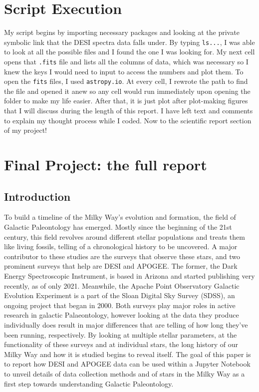 \documentclass{article}
\begin{document}
\section*{Script Execution}
My script begins by importing necessary packages and looking at the private symbolic link that the DESI spectra data falls under. By typing \texttt{ls...}, I was able to look at all the possible files and I found the one I was looking for. My next cell opens that \texttt{.fits} file and lists all the columns of data, which was necessary so I knew the keys I would need to input to access the numbers and plot them. To open the \texttt{fits} files, I used \texttt{astropy.io}. At every cell, I rewrote the path to find the file and opened it anew so any cell would run immediately upon opening the folder to make my life easier. After that, it is just plot after plot-making figures that I will discuss during the length of this report. I have left text and comments to explain my thought process while I coded. Now to the scientific report section of my project!\\

\section*{Final Project: the full report}
\subsection*{Introduction}
\indent To build a timeline of the Milky Way’s evolution and formation, the field of Galactic Paleontology has emerged. Mostly since the beginning of the 21st century, this field revolves around different stellar populations and treats them like living fossils, telling of a chronological history to be uncovered. A major contributor to these studies are the surveys that observe these stars, and two prominent surveys that help are DESI and APOGEE. The former, the Dark Energy Spectroscopic Instrument, is based in Arizona and started publishing very recently, as of only 2021. Meanwhile, the Apache Point Observatory Galactic Evolution Experiment is a part of the Sloan Digital Sky Survey (SDSS), an ongoing project that began in 2000. Both surveys play major roles in active research in galactic Palaeontology, however looking at the data they produce individually does result in major differences that are telling of how long they’ve been running, respectively. By looking at multiple stellar parameters, at the functionality of these surveys and at individual stars, the long history of our Milky Way and how it is studied begins to reveal itself. The goal of this paper is to report how DESI and APOGEE data can be used within a Jupyter Notebook to unveil details of data collection methods and of stars in the Milky Way as a first step towards understanding Galactic Paleontology. 
\end{document}
